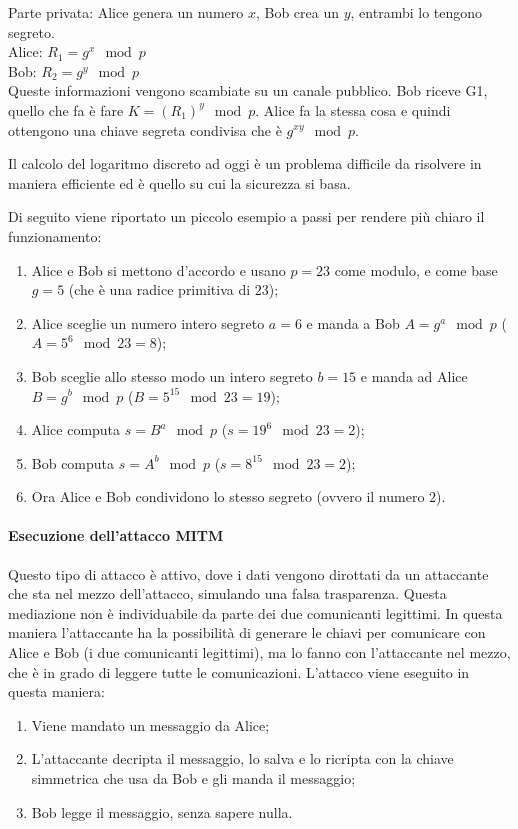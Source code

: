 
Parte privata: Alice genera un numero $x$, Bob crea un $y$, entrambi lo tengono
segreto.\\
\newline
Alice: $R_1 = g^x \mod p$\\
Bob: $R_2 = g^y \mod p$\\
\newline
Queste informazioni vengono scambiate su un canale pubblico. Bob riceve G1, 
quello che fa è fare $K = (R_1)^y \mod p$. Alice fa la stessa cosa e quindi 
ottengono una chiave segreta condivisa che è $g^{xy} \mod p$.

Il calcolo del logaritmo discreto ad oggi è un problema difficile da
risolvere in maniera efficiente ed è quello su cui la sicurezza si basa.


Di seguito viene riportato un piccolo esempio a passi per rendere più chiaro
il funzionamento:
\begin{enumerate}
 \item Alice e Bob si mettono d'accordo e usano $p = 23$ come modulo, e come
base $g = 5$ (che \`e una radice primitiva di $23$);
 \item Alice sceglie un numero intero segreto $a = 6$ e manda a Bob $A = g^a
\mod p$ ($A = 5^6 \mod 23 = 8$);
 \item Bob sceglie allo stesso modo un intero segreto $b = 15$ e manda ad Alice
$B = g^b \mod p$ ($B = 5^{15} \mod 23 = 19$);
 \item Alice computa $s = B^a \mod p$ ($s = 19^6 \mod 23 = 2$);
 \item Bob computa $s = A^b \mod p$ ($s = 8^{15} \mod 23 = 2$);
 \item Ora Alice e Bob condividono lo stesso segreto (ovvero il numero $2$).

\end{enumerate}


\paragraph{Esecuzione dell'attacco MITM}

Questo tipo di attacco è attivo, dove i dati vengono dirottati da un attaccante
che sta nel mezzo dell'attacco, simulando una falsa trasparenza. Questa
mediazione non è individuabile da parte dei due comunicanti legittimi. In
questa maniera l'attaccante ha la possibilità di generare le chiavi per
comunicare con Alice e Bob (i due comunicanti legittimi), ma lo fanno con
l'attaccante nel mezzo, che è in grado di leggere tutte le comunicazioni.
L'attacco viene eseguito in questa maniera:
\begin{enumerate}
\item Viene mandato un messaggio da Alice;
\item L'attaccante decripta il messaggio, lo salva e lo ricripta con la chiave
simmetrica che usa da Bob e gli manda il messaggio;
\item Bob legge il messaggio, senza sapere nulla.
\end{enumerate}



